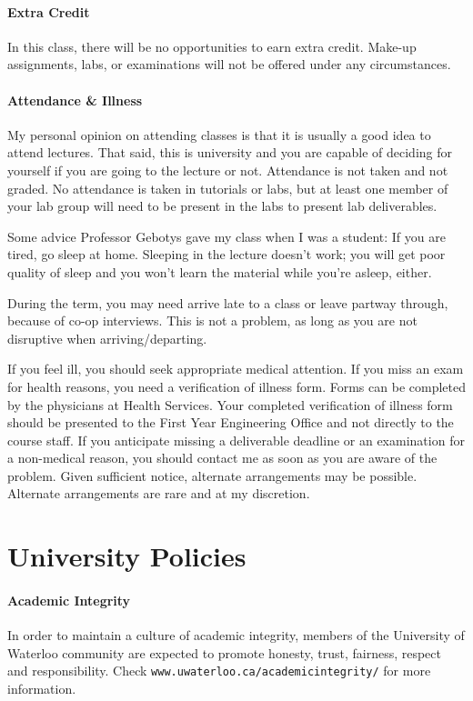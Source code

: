 \documentclass[letterpaper,10pt]{article}
\begin{document}
\paragraph{Extra Credit}
In this class, there will be no opportunities to earn extra credit. Make-up assignments, labs, or examinations will not be offered under any circumstances.

\paragraph{Attendance \& Illness}

My personal opinion on attending classes is that it is usually a good idea to attend lectures. That said, this is university and you are capable of deciding for yourself if you are going to the lecture or not. Attendance is not taken and not graded. No attendance is taken in tutorials or labs, but at least one member of your lab group will need to be present in the labs to present lab deliverables.

Some advice Professor Gebotys gave my class when I was a student: If you are tired, go sleep at home. Sleeping in the lecture doesn't work; you will get poor quality of sleep and you won't learn the material while you're asleep, either.

During the term, you may need arrive late to a class or leave partway through, because of co-op interviews. This is not a problem, as long as you are not disruptive when arriving/departing.

If you feel ill, you should seek appropriate medical attention. If you miss an exam for health reasons, you need a verification of illness form. Forms can be completed by the physicians at Health Services. Your completed verification of illness form should be presented to the First Year Engineering Office and not directly to the course staff. If you anticipate missing a deliverable deadline or an examination for a non-medical reason, you should contact me as soon as you are aware of the problem. Given sufficient notice, alternate arrangements may be possible. Alternate arrangements are rare and at my discretion.


\section*{University Policies}

\paragraph{Academic Integrity}
In order to maintain a culture of academic integrity, members of the University of Waterloo community are expected to promote honesty, trust, fairness, respect and responsibility. Check \texttt{www.uwaterloo.ca/academicintegrity/} for more information.
\end{document}
